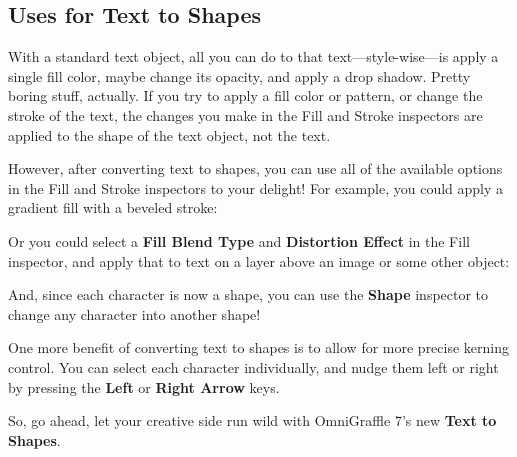 \documentclass[../main.tex]{subfiles}
\begin{document}
\begin{ogsidebar}
\begin{itemize}
  \end{itemize}

  \subsection{Uses for Text to Shapes}

  With a standard text object, all you can do to that text---style-wise---is apply a single fill
  color, maybe change its opacity, and apply a drop shadow. Pretty boring stuff, actually. If
  you try to apply a fill color or pattern, or change the stroke of the text, the changes you
  make in the Fill and Stroke inspectors are applied to the shape of the text object, not the
  text.

  However, after converting text to shapes, you can use all of the available options in the Fill
  and Stroke inspectors to your delight! For example, you could apply a gradient fill with a
  beveled stroke:


  Or you could select a \textbf{Fill Blend Type} and \textbf{Distortion Effect} in the Fill
  inspector, and apply that to text on a layer above an image or some other object:


  And, since each character is now a shape, you can use the \textbf{Shape} inspector to change
  any character into another shape!


  One more benefit of converting text to shapes is to allow for more precise kerning control.
  You can select each character individually, and nudge them left or right by pressing the
  \textbf{Left} or \textbf{Right Arrow} keys.

  So, go ahead, let your creative side run wild with OmniGraffle 7's new \textbf{Text to
  Shapes}.
\end{ogsidebar}
\end{document}
